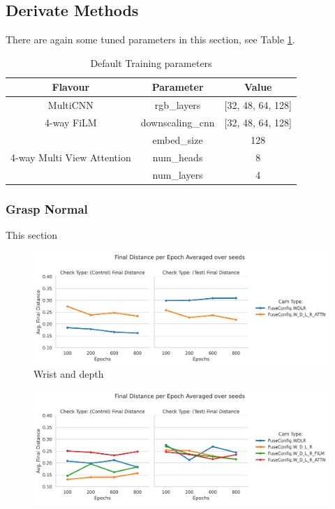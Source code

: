 \subsection{Derivate Methods}
There are again some tuned parameters in this section, see Table \ref{tab:derivative-params}.

\begin{table}[H]
\centering
  \begin{tabular}{|| c | c | c ||}
  \hline
  Flavour & Parameter & Value \\
  \hline
  \multirow{1}{*}{MultiCNN} & rgb\_layers & [32, 48, 64, 128] \\
  \hline
  \multirow{1}{*}{4-way FiLM} & downscaling\_cnn & [32, 48, 64, 128] \\
  \hline
  \multirow{3}{*}{4-way Multi View Attention} & embed\_size & 128 \\
  & num\_heads & 8 \\
  & num\_layers & 4 \\
  \hline
  \end{tabular}\caption{Default Training parameters}\label{tab:derivative-params}
\end{table}

\subsubsection{Grasp Normal}
This section
\begin{figure}[H]
  \centering
  \includegraphics[width=\linewidth]{assets/evaluation/derivatives/grasp-normal-wd.png}
  \caption{Wrist and depth}\label{fig:deriv-normal-final-wd}
\end{figure}

\begin{figure}[H]
  \centering
  \includegraphics[width=\linewidth]{assets/evaluation/derivatives/grasp-normal-allcams.png}
  \caption{}\label{fig:deriv-normal-final-allcams}
\end{figure}

